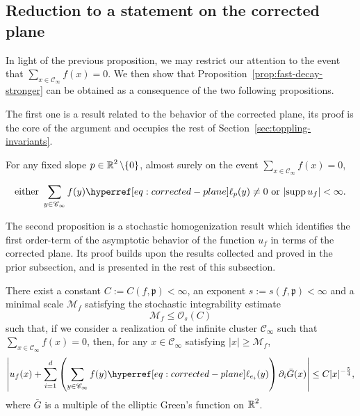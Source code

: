 \documentclass[12pt]{amsart}
\numberwithin{equation}{section}
\begin{document}
	\subsection{Reduction to a statement on the corrected plane}
	In light of the previous proposition, we may restrict our attention to the event that $\sum_{x \in \mathscr{C}_{\infty}} f(x) = 0$.
	We then show that Proposition~\ref{prop:fast-decay-stronger} can be obtained as a consequence of the two following propositions.
	
	The first one is a result related to the behavior of the corrected plane, its proof is the core of the argument and occupies the rest of Section~\ref{sec:toppling-invariants}. 
	
	\begin{prop} \label{prop:gradient-trichotomy}
		For any fixed slope $p \in \operatorname{\mathbb{R}}^2 \setminus \{ 0 \}$, almost surely on the event $\sum_{x \in \mathscr{C}_\infty} f(x) = 0$, 
		
		\begin{equation} \label{eq:gradient-growth-bound}
			\mbox{either}~ \sum_{y \in \mathscr{C}_\infty} f(y) \ellp{p}(y) \neq 0 ~\mbox{or}~ |\supp u_f| < \infty.
		\end{equation}
	\end{prop}
	
	The second proposition is a stochastic homogenization result which identifies the first order-term of the asymptotic behavior of the function $u_f$ in terms of the corrected plane. Its proof builds upon the results collected and proved in the prior subsection, and is presented in the rest of this subsection.
	
	
	\begin{prop} \label{prop:two-scale-expansion-mean-zero}
		There exist a constant $C := C ( f, \mathfrak{p}) < \infty$, an exponent $s := s(f, \mathfrak{p}) < \infty$ and a minimal scale $\mathcal{M}_f$ satisfying the stochastic integrability estimate
		\begin{equation} \label{eq:stochastic-integrability-bound-two-scale-expansion}
			\mathcal{M}_f \leq \mathcal{O}_s (C) 
		\end{equation}
		such that, if we consider a realization of the infinite cluster $\mathscr{C}_\infty$ such that $\sum_{x \in \mathscr{C}_{\infty}} f(x) = 0 $, then, for any $x \in \mathscr{C}_\infty$ satisfying $|x| \geq \mathcal{M}_f$, 
		\begin{equation} \label{eq:two-scale-expansion-mean-zero}
			\left| u_f (x) +  \sum_{i = 1}^d \left(\sum_{y \in \mathscr{C}_\infty} f(y) \ellp{e_i}(y) \right) \partial_i \bar G(x) \right| \leq C |x|^{-\frac{5}{4}},
		\end{equation}
		where $\bar G$ is a multiple of the elliptic Green's function on $\operatorname{\mathbb{R}}^2$. 
	\end{prop} 
	
\end{document}
